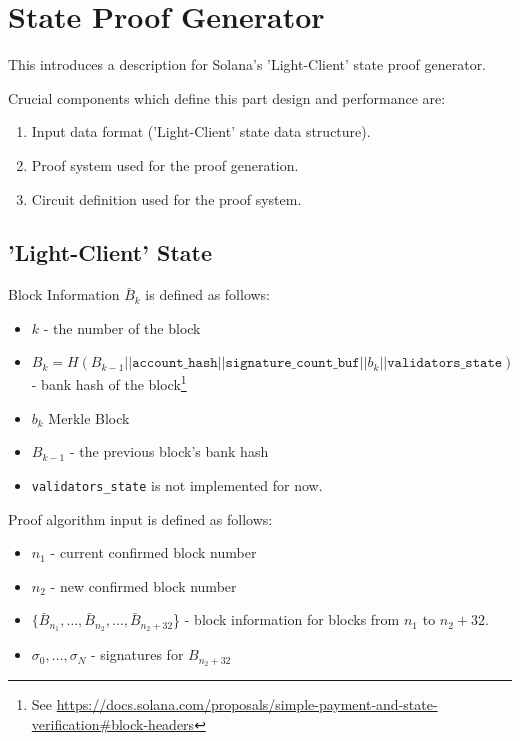 \chapter{State Proof Generator}

This introduces a description for Solana's 'Light-Client' state proof generator.

Crucial components which define this part design and performance are:
\begin{enumerate}
    \item Input data format ('Light-Client' state data structure).
    \item Proof system used for the proof generation.
    \item Circuit definition used for the proof system.
\end{enumerate}

\section{'Light-Client' State}

Block Information $\bar B_k$ is defined as follows:
\begin{itemize}
    \item $k$ - the number of the block
    \item $B_k = H(B_{k - 1} || \texttt{account\_hash} || \texttt{signature\_count\_buf} || b_k || \texttt{validators\_state})$ - bank hash of the block\footnote{See \url{https://docs.solana.com/proposals/simple-payment-and-state-verification\#block-headers}}
    \item $b_k$ Merkle Block
    \item $B_{k - 1}$ - the previous block's bank hash
    \item \texttt{validators\_state} is not implemented for now. 
\end{itemize}

Proof algorithm input is defined as follows:
\begin{itemize}
    \item $n_1$ - current confirmed block number
    \item $n_2$ - new confirmed block number
    \item $\{\bar B_{n_1}, \dots, \bar B_{n_2}, \dots, \bar B_{n_2 + 32}$\} - block information for blocks from $n_1$ to $n_2 + 32$.
    \item $\sigma_0, \dots, \sigma_N$ - signatures for $B_{n_2 + 32}$
\end{itemize}

